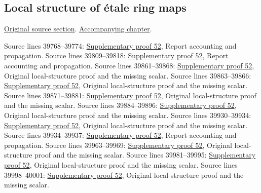\subsection{Local structure of \'etale ring maps}
\hypertarget{algebra-source-section-etale-local-structure}{}
\noindent\href{https://github.com/stacks/stacks-project/blob/a04446e57ec1fbc252a871afcec7752fb2807b14/algebra.tex\#L39754}{Original source section}. \href{algebra.pdf\#nameddest=section-etale-local-structure}{Accompanying chapter}.

\begin{AlgebraSourceRoutes}
 Source lines 39768--39774: \hyperlink{algebra_etale_local_notes_20260928}{Supplementary proof 52}, Report accounting and propagation.
 Source lines 39809--39818: \hyperlink{algebra_etale_local_notes_20260928}{Supplementary proof 52}, Report accounting and propagation.
 Source lines 39861--39868: \hyperlink{algebra_etale_local_notes_20260928}{Supplementary proof 52}, Original local-structure proof and the missing scalar.
 Source lines 39863--39866: \hyperlink{algebra_etale_local_notes_20260928}{Supplementary proof 52}, Original local-structure proof and the missing scalar.
 Source lines 39871--39881: \hyperlink{algebra_etale_local_notes_20260928}{Supplementary proof 52}, Original local-structure proof and the missing scalar.
 Source lines 39884--39896: \hyperlink{algebra_etale_local_notes_20260928}{Supplementary proof 52}, Original local-structure proof and the missing scalar.
 Source lines 39930--39934: \hyperlink{algebra_etale_local_notes_20260928}{Supplementary proof 52}, Original local-structure proof and the missing scalar.
 Source lines 39934--39937: \hyperlink{algebra_etale_local_notes_20260928}{Supplementary proof 52}, Report accounting and propagation.
 Source lines 39963--39969: \hyperlink{algebra_etale_local_notes_20260928}{Supplementary proof 52}, Original local-structure proof and the missing scalar.
 Source lines 39981--39995: \hyperlink{algebra_etale_local_notes_20260928}{Supplementary proof 52}, Original local-structure proof and the missing scalar.
 Source lines 39998--40001: \hyperlink{algebra_etale_local_notes_20260928}{Supplementary proof 52}, Original local-structure proof and the missing scalar.

\end{AlgebraSourceRoutes}
